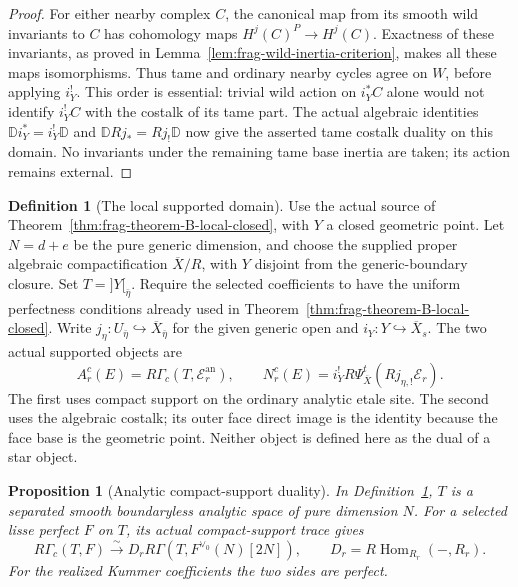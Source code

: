 \documentclass[11pt]{article}
\newtheorem{proposition}[theorem]{Proposition}
\theoremstyle{definition}
\newtheorem{definition}[theorem]{Definition}
\theoremstyle{remark}
\begin{document}
\begin{proof}
For either nearby complex $C$, the canonical map from its smooth
wild invariants to $C$ has cohomology maps
$H^j(C)^P\to H^j(C)$.  Exactness of these invariants, as proved in
Lemma~\ref{lem:frag-wild-inertia-criterion}, makes all these maps
isomorphisms.  Thus tame and ordinary nearby cycles agree on $W$,
before applying $i_Y^!$.  This order is
essential: trivial wild action on $i_Y^*C$ alone would not identify
$i_Y^!C$ with the costalk of its tame part.  The actual algebraic
identities $\mathbb D i_Y^*=i_Y^!\mathbb D$ and
$\mathbb D Rj_*=Rj_!\mathbb D$ now give the asserted tame costalk
duality on this domain.  No invariants under the remaining tame base
inertia are taken; its action remains external.
\end{proof}

\begin{definition}[The local supported domain]
\label{def:frag-S-local-domain}
Use the actual source of Theorem~\ref{thm:frag-theorem-B-local-closed},
with $Y$ a closed geometric point.  Let $N=d+e$ be the pure generic
dimension, and choose the supplied proper algebraic compactification
$\overline X/R$, with $Y$ disjoint from the generic-boundary closure.
Set $T=]Y[_{\bar\eta}$.  Require the selected coefficients to have the
uniform perfectness conditions already used in Theorem~\ref{thm:frag-theorem-B-local-closed}.
Write $j_\eta:U_{\bar\eta}\hookrightarrow\overline X_{\bar\eta}$ for
the given generic open and $i_Y:Y\hookrightarrow\overline X_s$.
The two actual supported objects are
\[
 A^c_r(E)=R\Gamma_c(T,\mathcal E_r^{\mathrm{an}}),\qquad
 N^c_r(E)=i_Y^!R\Psi^t_{\overline X}(Rj_{\eta,!}\mathcal E_r).
\]
The first uses compact support on the ordinary analytic etale site.
The second uses the algebraic costalk; its outer face direct image is
the identity because the face base is the geometric point.
Neither object is defined here as the dual of a star object.
\end{definition}

\begin{proposition}[Analytic compact-support duality]
\label{prop:frag-S-analytic-duality}
In Definition~\ref{def:frag-S-local-domain}, $T$ is a separated smooth
boundaryless analytic space of pure dimension $N$.  For a selected lisse
perfect $F$ on $T$, its actual compact-support trace gives
\[
 R\Gamma_c(T,F)\xrightarrow{\sim}
 D_r R\Gamma(T,F^{\vee_0}(N)[2N]),\qquad
 D_r=R\operatorname{Hom}_{R_r}(-,R_r).
\]
For the realized Kummer coefficients the two sides are perfect.
\end{proposition}
\end{document}
